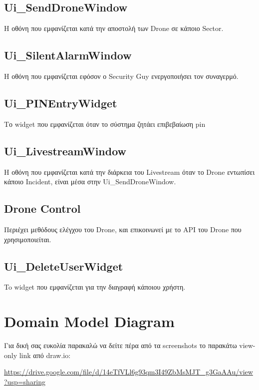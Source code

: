 \documentclass{article}
\begin{document}
\subsection{Ui\_SendDroneWindow}
Η οθόνη που εμφανίζεται κατά την αποστολή των Drone σε κάποιο Sector.

\subsection{Ui\_SilentAlarmWindow}
Η οθόνη που εμφανίζεται εφόσον ο Security Guy ενεργοποιήσει τον συναγερμό.

\subsection{Ui\_PINEntryWidget}
Το widget που εμφανίζεται όταν το σύστημα ζητάει επιβεβαίωση pin

\subsection{Ui\_LivestreamWindow}
Η οθόνη που εμφανίζεται κατά την διάρκεια του Livestream όταν το Drone εντωπίσει κάποιο Incident, είναι μέσα στην Ui\_SendDroneWindow.

\subsection{Drone Control}
Περιέχει μεθόδους ελέγχου του Drone, και επικοινωνεί με το API του Drone που χρησιμοποιείται.

\subsection{Ui\_DeleteUserWidget}
To widget που εμφανίζεται για την διαγραφή κάποιου χρήστη.  



\section{Domain Model Diagram}
Για δική σας ευκολία παρακαλώ να δείτε πέρα από τα screenshots το παρακάτω view-only link από draw.io:

\url{https://drive.google.com/file/d/14eTfVLl6g93qm3I49ZbMsMJT_g3GaAAu/view?usp=sharing}

\newpage
\noindent{}\newpage
\end{document}
